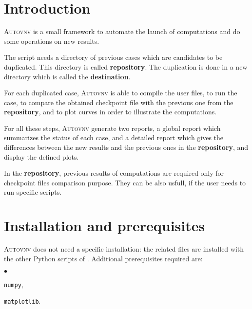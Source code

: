 \documentclass[a4paper,10pt,twoside]{csshortdoc}
\begin{document}
\def\contentsname{\textbf{\normalsize TABLE OF CONTENTS}\pdfbookmark[1]{Table of
contents}{contents}}

\large
\makepdgCS
\normalsize

\passepage

\begin{center}\begin{singlespace}
\tableofcontents
\end{singlespace}\end{center}
%
\section{Introduction}

\textsc{Autovnv} is a small framework to automate the launch of \CS computations
and do some operations on new results.

The script needs a directory of previous \CS cases which are candidates to be
duplicated. This directory is called \textbf{repository}. The duplication is
done in a new directory which is called the \textbf{destination}.

For each duplicated case, \textsc{Autovnv} is able to compile the user files, to
run the case, to compare the obtained checkpoint file with the previous one from
the \textbf{repository}, and to plot curves in order to illustrate the
computations.

For all these steps, \textsc{Autovnv} generate two reports, a global report
which summarizes the status of each case, and a detailed report which gives the
differences between the new results and the previous ones in the
\textbf{repository}, and display the defined plots.

In the \textbf{repository}, previous results of computations are required only
for checkpoint files comparison purpose. They can be also usfull, if the user
needs to run specific scripts.

\section{Installation and prerequisites}

\textsc{Autovnv} does not need a specific installation: the related files are
installed with the other Python scripts of \CS. Additional prerequisites
required are:
\begin{list}{$\bullet$}{}
\item \texttt{numpy},
\item \texttt{matplotlib}.
\end{list}
\end{document}
